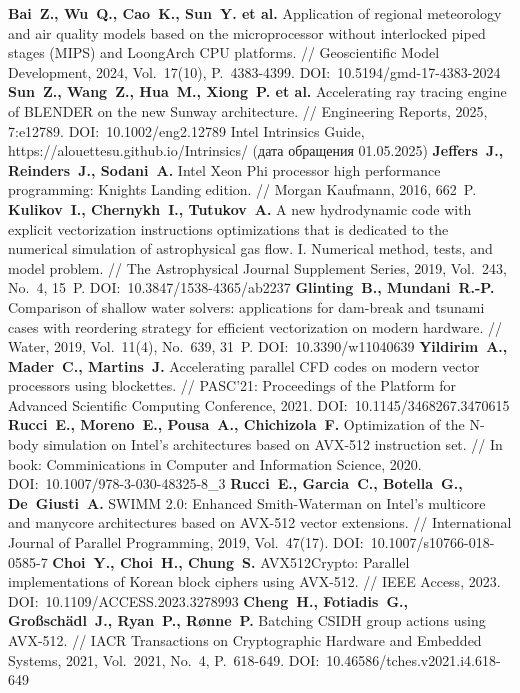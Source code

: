 \begin{thebibliography}{99}
%
\textbf{Bai~Z., Wu~Q., Cao~K., Sun~Y. et al.} Application of regional meteorology and air quality models based on the microprocessor without interlocked piped stages (MIPS) and LoongArch CPU platforms. // Geoscientific Model Development, 2024, Vol.~17(10), P.~4383-4399. DOI:~10.5194/gmd-17-4383-2024
%
\textbf{Sun~Z., Wang~Z., Hua~M., Xiong~P. et al.} Accelerating ray tracing engine of BLENDER on the new Sunway architecture. // Engineering Reports, 2025, 7:e12789. DOI:~10.1002/eng2.12789
%
Intel Intrinsics Guide, https://alouettesu.github.io/Intrinsics/ (дата обращения 01.05.2025)
%
\textbf{Jeffers~J., Reinders~J., Sodani~A.} Intel Xeon Phi processor high performance programming: Knights Landing edition. // Morgan Kaufmann, 2016, 662~P.
%
\textbf{Kulikov~I., Chernykh~I., Tutukov~A.} A new hydrodynamic code with explicit vectorization instructions optimizations that is dedicated to the numerical simulation of astrophysical gas flow. I. Numerical method, tests, and model problem. // The Astrophysical Journal Supplement Series, 2019, Vol.~243, No.~4, 15~P. DOI:~10.3847/1538-4365/ab2237
%
\textbf{Glinting~B., Mundani~R.-P.} Comparison of shallow water solvers: applications for dam-break and tsunami cases with reordering strategy for efficient vectorization on modern hardware. // Water, 2019, Vol.~11(4), No.~639, 31~P. DOI:~10.3390/w11040639
%
\textbf{Yildirim~A., Mader~C., Martins~J.} Accelerating parallel CFD codes on modern vector processors using blockettes. // PASC’21: Proceedings of the Platform for Advanced Scientific Computing Conference, 2021.
DOI:~10.1145/3468267.3470615
%
\textbf{Rucci~E., Moreno~E., Pousa~A., Chichizola~F.} Optimization of the N-body simulation on Intel’s architectures based on AVX-512 instruction set. // In book: Comminications in Computer and Information Science, 2020.
DOI:~10.1007/978-3-030-48325-8\_3
%
\textbf{Rucci~E., Garcia~C., Botella~G., De~Giusti~A.} SWIMM 2.0: Enhanced Smith-Waterman on Intel’s multicore and manycore architectures based on AVX-512 vector extensions. // International Journal of Parallel Programming,
2019, Vol.~47(17). DOI:~10.1007/s10766-018-0585-7
%
\textbf{Choi~Y., Choi~H., Chung~S.} AVX512Crypto: Parallel implementations of Korean block ciphers using AVX-512. // IEEE Access, 2023. DOI:~10.1109/ACCESS.2023.3278993
%
\textbf{Cheng~H., Fotiadis~G., Gro{\ss}sch{\"a}dl~J., Ryan~P., R{\o}nne~P.} Batching CSIDH group actions using AVX-512. // IACR Transactions on Cryptographic Hardware and Embedded Systems, 2021, Vol.~2021, No.~4, P.~618-649. DOI:~10.46586/tches.v2021.i4.618-649

\end{thebibliography}
